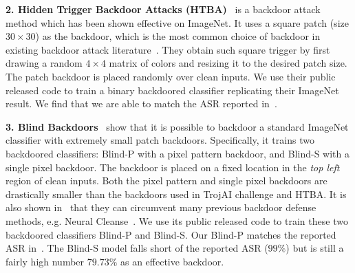 \documentclass[10pt,twocolumn,letterpaper]{article}
\begin{document}


\noindent \textbf{2. Hidden Trigger Backdoor Attacks (HTBA)}~\cite{htba} is a backdoor attack method which has been shown effective on ImageNet. It uses a square patch (size $30\times 30$) as the backdoor, which is the most common choice of backdoor in existing backdoor attack literature~\cite{badnet,turner2019cleanlabel,carlini2022clip}. They obtain such square trigger by first drawing a random $4\times 4$ matrix of colors and resizing it to the desired patch size. The patch backdoor is placed randomly over clean inputs. We use their public released code to train a binary backdoored classifier replicating their ImageNet result. We find that we are able to match the ASR reported in~\cite{htba}.

\noindent \textbf{3. Blind Backdoors}~\cite{bagdasaryan2020blind} show that it is possible to backdoor a standard ImageNet classifier with extremely small patch backdoors. Specifically, it trains two backdoored classifiers: Blind-P with a pixel pattern  backdoor, and Blind-S with a single pixel backdoor. The backdoor is placed on a fixed location in the \textit{top left} region of clean inputs. Both the pixel pattern and single pixel backdoors are drastically smaller than the backdoors used in TrojAI challenge and HTBA. It is also shown in~\cite{bagdasaryan2020blind} that they can circumvent many previous backdoor defense methods, e.g. Neural Cleanse~\cite{nc2019wang}. We use its public released code to train these two backdoored classifiers Blind-P and Blind-S. 
Our Blind-P matches the reported ASR in~\cite{bagdasaryan2020blind}. The Blind-S model falls short of the reported ASR ($99\%$) but is still a fairly high number $79.73\%$ as an effective backdoor.
\end{document}
